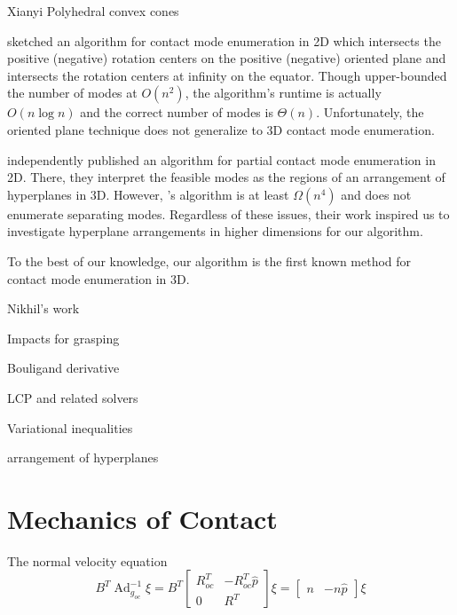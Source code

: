 \documentclass[conference]{IEEEtran}
\DeclareMathOperator{\adjoint}{Ad}
\newcommand{\TODO}[1]{{\color{red} {{#1}}  }}
\begin{document}
\begin{inparaenum}
    \item \TODO{Xianyi} Polyhedral convex cones
    \item \citet{mason_mechanics_2001} sketched an algorithm for contact mode
    enumeration in 2D which intersects the positive (negative) rotation centers
    on the positive (negative) oriented plane and intersects the rotation
    centers at infinity on the equator. Though \citet{mason_mechanics_2001}
    upper-bounded the number of modes at $O(n^2)$, the algorithm's runtime is
    actually $O(n\log n)$ and the correct number of modes is $\Theta(n)$.
    Unfortunately, the oriented plane technique does not generalize to 3D
    contact mode enumeration.
    \item \citet{haas-heger_passive_2018} independently published an algorithm
    for partial contact mode enumeration in 2D. There, they interpret the
    feasible modes as the regions of an arrangement of hyperplanes in 3D.
    However, \citet{haas-heger_passive_2018}'s algorithm is at least
    $\Omega(n^4)$ and does not enumerate separating modes. Regardless of these
    issues, their work inspired us to investigate hyperplane arrangements in
    higher dimensions for our algorithm.
    \item To the best of our knowledge, our algorithm is the first known method
    for contact mode enumeration in 3D.
    \item Nikhil's work
    \item Impacts for grasping
    \item Bouligand derivative
    \item LCP and related solvers
    \item Variational inequalities
    \item arrangement of hyperplanes
\end{inparaenum}

\section{Mechanics of Contact}

\TODO{}

The normal velocity equation
\begin{equation}
B^T\adjoint_{g_{oc}}^{-1}\xi = 
B^T \begin{bmatrix}
        R_{oc}^T & -R_{oc}^T\widehat{p}\\
        0 & R^T
    \end{bmatrix}\xi = 
\begin{bmatrix} n & -n\widehat{p} \end{bmatrix}\xi
\end{equation}
\end{document}
